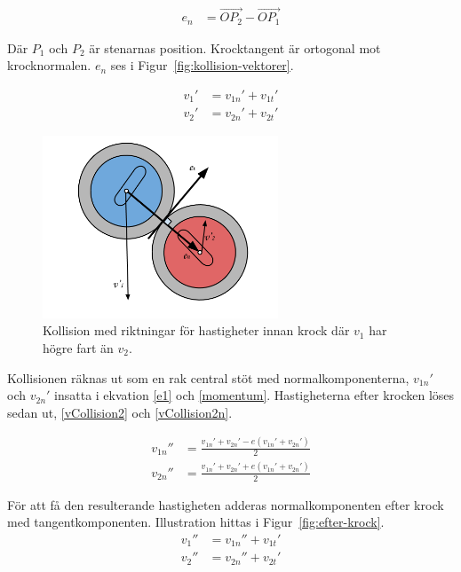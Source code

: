 \documentclass[11pt]{article} %
\begin{document}
 \begin{align}\label{e_normal}
e_n& = \overrightarrow{OP_2} -  \overrightarrow{OP_1}  
 \end{align}

Där $P_1$ och $P_2$ är stenarnas position. Krocktangent är ortogonal mot krocknormalen. $e_n$ ses i Figur~\ref{fig:kollision-vektorer}. 

 \begin{align}\label{vCollision}
v_1'& = v_{1n}' + v_{1t}'\\
v_2'& = v_{2n}' + v_{2t}'
 \end{align}

\begin{figure}[ht!]
\centering
\includegraphics[width=70mm]{kollision-vektorer.png}
\caption{Kollision med riktningar för hastigheter innan krock där $v_{1}$ har högre fart än $v_{2}$.}
\label{fig:kollision-vektorer}
\label{overflow}
\end{figure}

\pagebreak

Kollisionen räknas ut som en rak central stöt med normalkomponenterna, $v_{1n}'$ och  $v_{2n}'$ insatta i ekvation \eqref{e1} och \eqref{momentum}. Hastigheterna efter krocken löses sedan ut, \eqref{vCollision2} och \eqref{vCollision2n}.

 \begin{align}\label{vCollision2}
 v_{1n}''& = \frac{v_{1n}' + v_{2n}'  - e(v_{1n}' + v_{2n}')}{2} \\
 v_{2n}''& = \frac{v_{1n}' + v_{2n}'  + e(v_{1n}' + v_{2n}')}{2} \label{vCollision2n}
 \end{align}


För att få den resulterande hastigheten adderas normalkomponenten efter krock med tangentkomponenten. Illustration hittas i Figur~\ref{fig:efter-krock}. 
 \begin{align}\label{vfinal}
v_1''& = v_{1n}'' + v_{1t}'\\
v_2''& = v_{2n}'' + v_{2t}'
 \end{align}
\end{document}
